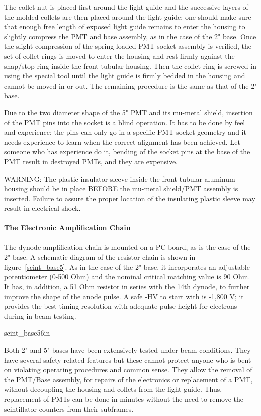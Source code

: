 The collet nut is placed first around the light guide and the successive layers 
of the molded collets are then placed around the light guide; one should make 
sure that enough free length of exposed light guide remains to enter the 
housing to slightly compress the PMT and base assembly, as in the case of the 
2" base. Once the slight compression of the spring loaded PMT-socket assembly 
is verified, the set of collet rings is moved to enter the housing and rest 
firmly against the snap/stop ring inside the front tubular housing. Then the 
collet ring is screwed in using the special tool until the light guide is 
firmly bedded in the housing and cannot be moved in or out. The remaining 
procedure is the same as that of the 2" base.

Due to the two diameter shape of the 5" PMT and its mu-metal shield, insertion  
of the PMT pins into the socket is a blind operation. It has to be done by feel 
and experience; the pins can only go in a specific PMT-socket geometry and it 
needs experience to learn when the correct alignment has been achieved. Let 
someone who has experience do it, bending of the socket pins at the base of the 
PMT result in destroyed PMTs, and they are expensive.

WARNING: The plastic insulator sleeve inside the front tubular aluminum 
housing should be in place BEFORE the mu-metal shield/PMT assembly is inserted. 
Failure to assure the proper location of the insulating plastic sleeve may 
result in electrical shock.
 
\paragraph{The Electronic Amplification Chain}


The dynode amplification chain is mounted on a PC board, as is the case of the 
2" base. A schematic diagram of the resistor chain is shown in 
figure~\ref{scint_base5}. As in 
the case of the 2" base, it incorporates an adjustable potentiometer (0-500 
Ohm) and the nominal critical matching value is 90 Ohm. It has, in addition, a 
51 Ohm resistor in series with the 14th dynode, to further improve the shape of 
the anode pulse. A safe -HV to start with is -1,800 V; it provides the best 
timing resolution with adequate pulse height for electrons during in beam 
testing.

{scint_base5}{6in}


   Both 2" and 5" bases have been extensively tested under beam conditions. 
They have several safety related features but these cannot protect anyone who 
is bent on violating operating procedures and common sense. They allow the 
removal of the PMT/Base assembly, for repairs of the electronics or replacement 
of a PMT, without decoupling the housing and collets from the light guide. 
Thus, replacement of PMTs can be done in minutes without the need to remove the 
scintillator counters from their subframes.



